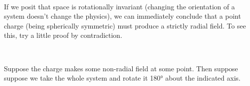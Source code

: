 \documentclass{article}
\numberwithin{equation}{section}
\newcommand{\bunny}[1][]{
    \tikz \fill [scale=1ex/500,yscale=1,#1] svg "M3831 8683 c-70 -71 -235 -358 -326 -567 -168 -385 -252 -748 -275 -1181 -5 -104 -9 -199 -7 -209 2 -16 -10 -21 -88 -36 -158 -31 -407 -112 -530 -173 -117 -58 -239 -150 -365 -277 -178 -177 -305 -366 -407 -604 -44 -102 -55 -118 -136 -201 -110 -113 -148 -183 -154 -288 -4 -53 0 -88 14 -132 12 -37 16 -70 12 -85 -4 -14 -7 -62 -8 -107 -3 -225 125 -386 369 -461 66 -20 157 -35 282 -47 l68 -7 -25 -47 c-41 -81 -59 -197 -52 -341 10 -200 66 -413 174 -660 153 -347 352 -632 640 -914 l104 -102 9 -95 c13 -131 12 -378 -1 -441 -25 -115 -92 -205 -180 -242 -138 -58 -168 -77 -220 -139 -92 -109 -110 -180 -63 -237 63 -75 165 -100 429 -107 159 -4 215 -2 275 11 267 57 455 273 539 619 20 84 29 107 41 103 8 -3 89 -37 179 -76 197 -86 466 -177 651 -220 74 -18 142 -34 150 -37 8 -3 -14 -15 -50 -28 -257 -88 -340 -205 -227 -319 48 -47 82 -58 257 -78 225 -26 1652 -9 1850 23 75 12 154 51 184 92 22 30 23 43 15 268 -3 65 0 83 25 133 50 102 131 161 255 187 46 9 67 8 150 -11 230 -54 428 -7 556 131 71 77 99 149 92 240 -7 115 -65 203 -185 282 -218 145 -282 308 -264 665 30 563 -100 1035 -383 1397 -78 99 -236 254 -335 327 -319 238 -731 392 -1245 468 -301 44 -438 49 -1090 37 -69 -2 -107 3 -160 20 l-70 22 3 238 c3 183 0 265 -12 356 -18 123 -53 275 -81 340 -16 38 -16 40 9 70 456 567 686 1088 725 1647 21 289 -41 691 -116 749 -28 23 -72 27 -106 10 -63 -31 -322 -342 -452 -541 -38 -59 -73 -108 -77 -108 -5 0 -8 11 -8 24 0 14 -9 74 -21 133 -44 228 -158 517 -217 547 -50 26 -80 20 -121 -21z";
}
\begin{document}
\begin{minipage}{0.5\textwidth}
\begin{flushleft}
\begin{figure}[H]
\label{fig:2:point}
\end{figure}
\end{flushleft}
\end{minipage}
~
\begin{minipage}{0.5\textwidth}
\begin{flushright}
\parbox[c]{\textwidth}{If we posit that space is rotationally invariant (changing the orientation of a system doesn't change the physics), we can immediately conclude that a point charge (being spherically symmetric) must produce a strictly radial field. To see this, try a little proof by contradiction.}
\end{flushright}
\end{minipage}

\begin{minipage}{0.5\textwidth}
\begin{flushleft}
\begin{figure}[H]
\label{fig:2:b}
\end{figure}
\end{flushleft}
\end{minipage}
~
\begin{minipage}{0.5\textwidth}
\begin{flushright}
\parbox[c]{\textwidth}{Suppose the charge makes some non-radial field at some point. Then suppose suppose we take the whole system and rotate it \ang{180} about the indicated axis.}
\end{flushright}
\end{minipage}
\end{document}
